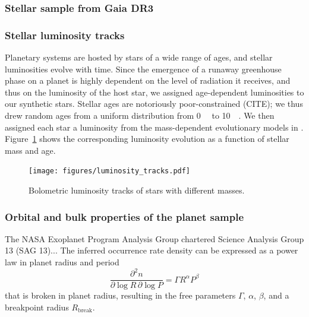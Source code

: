 \documentclass[modern]{aastex631}
\begin{document}
\subsubsection{Stellar sample from Gaia DR3}

\subsubsection{Stellar luminosity tracks}
\begin{note}
    Planetary systems are hosted by stars of a wide range of ages, and stellar luminosities evolve with time.
    Since the emergence of a runaway greenhouse phase on a planet is highly dependent on the level of radiation it receives, and thus on the luminosity of the host star, we assigned age-dependent luminosities to our synthetic stars.
    Stellar ages are notoriously poor-constrained (CITE); we thus drew random ages from a uniform distribution from \SI{0}{\giga\year} to \SI{10}{\giga\year}.
    We then assigned each star a luminosity from the mass-dependent evolutionary models in \citet{Baraffe1998}.
    Figure~\ref{fig:luminosity_tracks} shows the corresponding luminosity evolution as a function of stellar mass and age.

\end{note}

\begin{figure}[ht!]
    \begin{centering}
        \texttt{[image: figures/luminosity\_tracks.pdf]}
        \caption{
            Bolometric luminosity tracks of stars with different masses.
        }
        \label{fig:luminosity_tracks}
    \end{centering}
\end{figure}


\subsubsection{Orbital and bulk properties of the planet sample}

\begin{note}
    The NASA Exoplanet Program Analysis Group chartered Science Analysis Group 13 (SAG 13)...
    The inferred occurrence rate density can be expressed as a power law in planet radius and period
    \begin{equation}
        \frac{\partial^2n}{\partial \log R \, \partial \log P} = \Gamma R^{\alpha} P^{\beta}
    \end{equation}
that is broken in planet radius, resulting in the free parameters $\Gamma$, $\alpha$, $\beta$, and a breakpoint radius $R_\mathrm{break}$.
\end{note}
\end{document}
